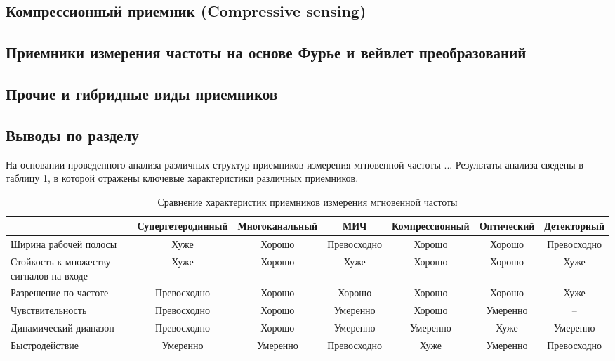 \subsection{Компрессионный приемник (Compressive sensing)}

\subsection{Приемники измерения частоты на основе Фурье и вейвлет преобразований}

\subsection{Прочие и гибридные виды приемников}

\subsection{Выводы по разделу}

На основании проведенного анализа различных структур приемников измерения мгновенной частоты ...
Результаты анализа сведены в таблицу \ref{t:survey}, в которой отражены ключевые характеристики различных приемников.

\begin{table}
\caption{Сравнение характеристик приемников измерения мгновенной частоты\label{t:survey}}
	\begin{adjustbox}{width=\columnwidth,center}
		
		\begin{tabular}{@{}m{8em}cccccc@{}}
			\toprule
													&	Супергетеродинный	& Многоканальный & МИЧ & Компрессионный & Оптический & Детекторный\\
			\midrule
			Ширина рабочей полосы					&	Хуже 				& Хорошо	& Превосходно	& Хорошо & Хорошо & Превосходно\\
			Стойкость к множеству сигналов на входе &	Хуже 				& Хорошо	& Хуже	& Хорошо & Хорошо & Хуже\\
			Разрешение по частоте 					& 	Превосходно 		& Хорошо	& Хорошо	& Хорошо & Хорошо & Хуже\\
			Чувствительность 						& 	Превосходно 		& Хорошо	& Умеренно	& Хорошо & Умеренно & --\\
			Динамический диапазон 					& 	Превосходно 		& Хорошо	& Умеренно	& Умеренно & Хуже & Умеренно\\
			Быстродействие							&	Умеренно			& Умеренно	& Превосходно & Хуже	& Умеренно & Превосходно \\
			\bottomrule
		\end{tabular}
	\end{adjustbox}
\end{table}

